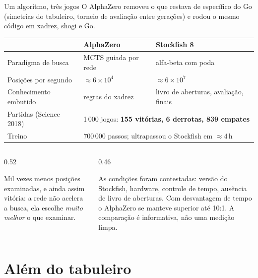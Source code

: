 \documentclass[aspectratio=169, 10pt]{beamer}
\begin{document}
\begin{frame}{Um algoritmo, três jogos}
  \footnotesize
  O AlphaZero removeu o que restava de específico do Go (simetrias do tabuleiro,
  torneio de avaliação entre gerações) e rodou o mesmo código em xadrez, shogi e Go.

  \medskip
  \centering
  \begin{tabular}{lll}
    \toprule
    & \textbf{AlphaZero} & \textbf{Stockfish 8} \\
    \midrule
    Paradigma de busca      & MCTS guiada por rede & alfa-beta com poda \\
    Posições por segundo    & $\approx 6\times 10^{4}$ & $\approx 6\times 10^{7}$ \\
    Conhecimento embutido   & regras do xadrez & livro de aberturas, avaliação, finais \\
    Partidas (Science 2018) & \multicolumn{2}{l}{1\,000 jogos: \textbf{155 vitórias, 6 derrotas, 839 empates}} \\[-0.1em]
    Treino                  & \multicolumn{2}{l}{700\,000 passos; ultrapassou o Stockfish em $\approx 4$\,h} \\
    \bottomrule
  \end{tabular}

  \smallskip
  \begin{columns}[T]
    \begin{column}{0.52\textwidth}
      \begin{ideiabox}
        Mil vezes menos posições examinadas, e ainda assim vitória: a rede não
        acelera a busca, ela escolhe \emph{muito melhor} o que examinar.
      \end{ideiabox}
    \end{column}
    \begin{column}{0.46\textwidth}
      \begin{alertabox}
        As condições foram contestadas: versão do Stockfish, hardware, controle de
        tempo, ausência de livro de aberturas. Com desvantagem de tempo o
        AlphaZero se manteve superior até 10:1. A comparação é informativa, não
        uma medição limpa.
      \end{alertabox}
    \end{column}
  \end{columns}
\end{frame}

\section{Além do tabuleiro}
\end{document}
